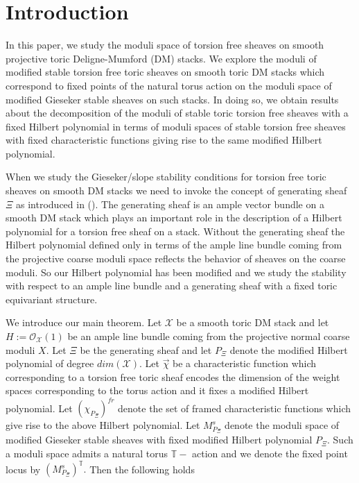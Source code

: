 \documentclass[10pt]{amsart}
\newcommand{\sO}{{\mathcal O}}
\newcommand{\sX}{{\mathcal X}}
\numberwithin{equation}{subsection}
\begin{document}
\section{Introduction}
\iffalse In this paper, we study the moduli space of torsion free sheaves on smooth projective toric Deligne-Mumford (DM) stacks. We explore the moduli of modified stable torsion free toric sheaves on smooth toric DM stacks which correspond to fixed points of the natural torus action on the moduli space of modified Gieseker stable sheaves on such stacks. In doing so, we obtain results about the decomposition of the moduli of stable toric torsion free sheaves with a fixed Hilbert polynomial  in terms of moduli spaces of stable torsion free sheaves with fixed characteristic functions giving rise to the same modified Hilbert polynomial.\par
When we study the Gieseker/slope stability conditions for torsion free toric sheaves on smooth DM stacks we need to invoke the concept of generating sheaf $\Xi$ as introduced in (\cite{Nir}). The generating sheaf is an ample vector bundle on a smooth DM stack which plays an important role in the description of a Hilbert polynomial for a torsion free sheaf on a stack. Without the generating sheaf the Hilbert polynomial defined only in terms of the ample line bundle coming from the projective coarse moduli space reflects the behavior of sheaves on the coarse moduli. So our Hilbert polynomial has been modified and we study the stability with respect to an ample line bundle and a generating sheaf with a fixed toric equivariant structure.\par
We introduce our main theorem. Let $\sX$ be a smooth toric DM stack and let $H:=\sO_{\sX}(1)$ be an ample line bundle coming from the projective normal coarse moduli $X.$ Let $\Xi$ be the generating sheaf and let $P_{\Xi}$ denote the modified Hilbert polynomial of degree $dim(\sX).$ Let $\vec\chi$ be a characteristic function which corresponding to a torsion free toric sheaf encodes the dimension of the weight spaces corresponding to the torus action and it fixes a modified Hilbert polynomial. Let $(\chi_{P_{\Xi}})^{fr}$ denote the set of framed characteristic functions which give rise to the above Hilbert polynomial. Let $M^s_{P_{\Xi}}$ denote the moduli space of modified Gieseker stable sheaves with fixed modified Hilbert polynomial $P_{\Xi}.$ Such a moduli space admits a natural torus $\mathbb{T}-$ action and we denote the fixed point locus by $(M^s_{P_{\Xi}})^{\mathbb{T}}.$ Then the following holds
\end{document}

